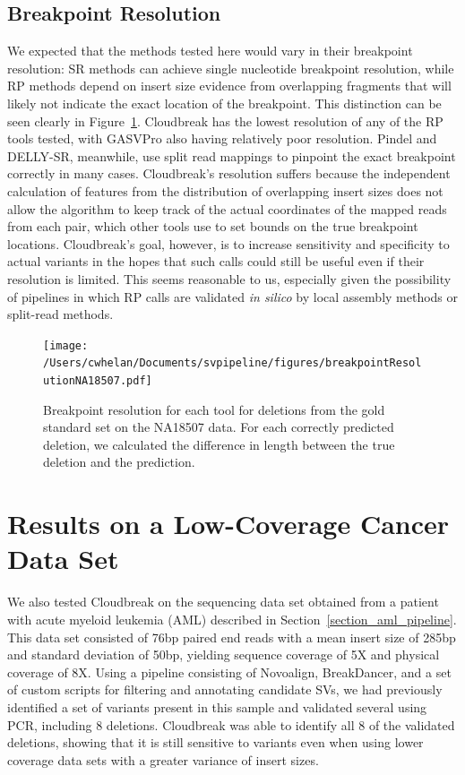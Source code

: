 \subsection{Breakpoint Resolution}

We expected that the methods tested here would vary in their breakpoint resolution: SR methods can achieve single nucleotide breakpoint resolution, while RP methods depend on insert size evidence from overlapping fragments that will likely not indicate the exact location of the breakpoint. This distinction can be seen clearly in Figure~\ref{breakpoint_resolution}. Cloudbreak has the lowest resolution of any of the RP tools tested, with GASVPro also having relatively poor resolution. Pindel and DELLY-SR, meanwhile, use split read mappings to pinpoint the exact breakpoint correctly in many cases. Cloudbreak's resolution suffers because the independent calculation of features from the distribution of overlapping insert sizes does not allow the algorithm to keep track of the actual coordinates of the mapped reads from each pair, which other tools use to set bounds on the true breakpoint locations. Cloudbreak's goal, however, is to increase sensitivity and specificity to actual variants in the hopes that such calls could still be useful even if their resolution is limited. This seems reasonable to us, especially given the possibility of pipelines in which RP calls are validated \emph{in silico} by local assembly methods or split-read methods.

\begin{figure}
\centering
\texttt{[image: /Users/cwhelan/Documents/svpipeline/figures/breakpointResolutionNA18507.pdf]}
\caption[Breakpoint resolution on the NA18507 data set.]{Breakpoint resolution for each tool for deletions from the gold standard set on the NA18507 data. For each correctly predicted deletion, we calculated the difference in length between the true deletion and the prediction.}
\label{breakpoint_resolution}
\end{figure}

\section{Results on a Low-Coverage Cancer Data Set}\label{section_cloudbreak_eval_aml}

We also tested Cloudbreak on the sequencing data set obtained from a patient with acute myeloid leukemia (AML) described in Section~\ref{section_aml_pipeline}. This data set consisted of 76bp paired end reads with a mean insert size of 285bp and standard deviation of 50bp, yielding sequence coverage of 5X and physical coverage of 8X. Using a pipeline consisting of Novoalign, BreakDancer, and a set of custom scripts for filtering and annotating candidate SVs, we had previously identified a set of variants present in this sample and validated several using PCR, including 8 deletions. Cloudbreak was able to identify all 8 of the validated deletions, showing that it is still sensitive to variants even when using lower coverage data sets with a greater variance of insert sizes.

